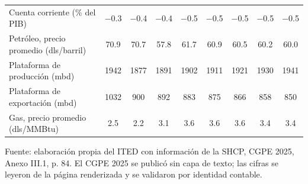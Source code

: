 \begin{table}[htbp]
{\begin{tabular}{L{4.6cm}cccccccc}
{Cuenta corriente (\% del PIB)} & \num{-0.3} & \num{-0.4} & \num{-0.4} & \num{-0.5} & \num{-0.5} & \num{-0.5} & \num{-0.5} & \num{-0.5} \\
{Petróleo, precio promedio (dls/barril)} & \num{70.9} & \num{70.7} & \num{57.8} & \num{61.7} & \num{60.9} & \num{60.5} & \num{60.2} & \num{60.0} \\
{Plataforma de producción (mbd)} & \num{1942} & \num{1877} & \num{1891} & \num{1902} & \num{1911} & \num{1921} & \num{1930} & \num{1941} \\
{Plataforma de exportación (mbd)} & \num{1032} & \num{900} & \num{892} & \num{883} & \num{875} & \num{866} & \num{858} & \num{850} \\
{Gas, precio promedio (dls/MMBtu)} & \num{2.5} & \num{2.2} & \num{3.1} & \num{3.6} & \num{3.6} & \num{3.6} & \num{3.4} & \num{3.4} \\
\bottomrule
\end{tabular}
}
\par\vspace{2pt}\footnotesize Fuente: elaboración propia del ITED con información de la SHCP, CGPE 2025, Anexo III.1, p. 84. El CGPE 2025 se publicó sin capa de texto; las cifras se leyeron de la página renderizada y se validaron por identidad contable.
\end{table}
